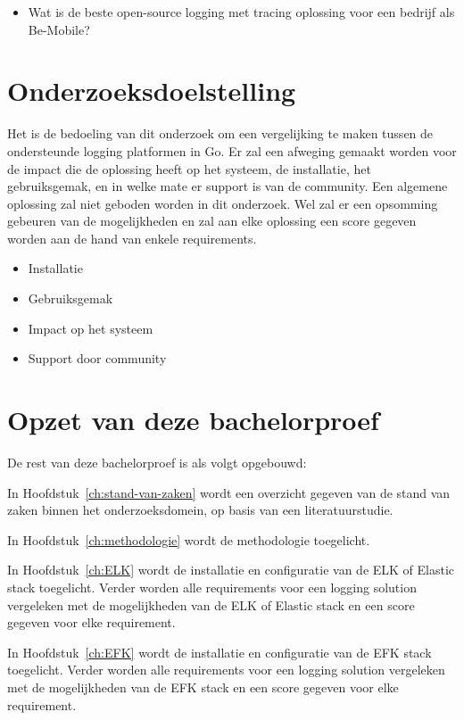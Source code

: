 \begin{itemize}
    \item  Wat is de beste open-source logging met tracing oplossing voor een bedrijf als Be-Mobile?
\end{itemize}

\section{Onderzoeksdoelstelling}
\label{sec:onderzoeksdoelstelling}

Het is de bedoeling van dit onderzoek om een vergelijking te maken tussen de ondersteunde logging platformen in Go. Er zal een afweging gemaakt worden voor de impact die de oplossing heeft op het systeem, de installatie, het gebruiksgemak, en in welke mate er support is van de community. Een algemene oplossing zal niet geboden worden in dit onderzoek. Wel zal er een opsomming gebeuren van de mogelijkheden en zal aan elke oplossing een score gegeven worden aan de hand van enkele requirements.

\begin{itemize}
    \item Installatie 
    \item Gebruiksgemak
    \item Impact op het systeem
    \item Support door community
\end{itemize}

\section{Opzet van deze bachelorproef}
\label{sec:opzet-bachelorproef}

De rest van deze bachelorproef is als volgt opgebouwd:

In Hoofdstuk~\ref{ch:stand-van-zaken} wordt een overzicht gegeven van de stand van zaken binnen het onderzoeksdomein, op basis van een literatuurstudie.

In Hoofdstuk~\ref{ch:methodologie} wordt de methodologie toegelicht. 

In Hoofdstuk~\ref{ch:ELK} wordt de installatie en configuratie van de ELK of Elastic stack toegelicht. Verder worden alle requirements voor een logging solution vergeleken met de mogelijkheden van de ELK of Elastic stack en een score gegeven voor elke requirement.

In Hoofdstuk~\ref{ch:EFK} wordt de installatie en configuratie van de EFK stack toegelicht. Verder worden alle requirements voor een logging solution vergeleken met de mogelijkheden van de EFK stack en een score gegeven voor elke requirement.

